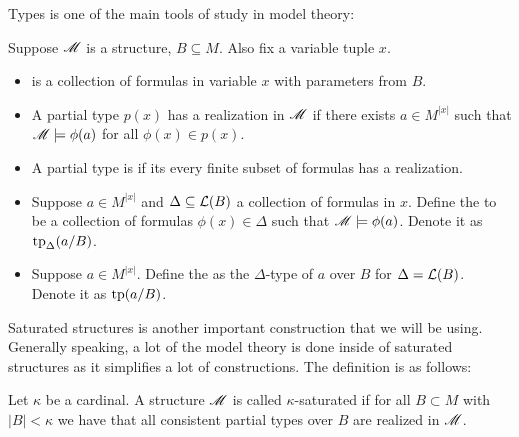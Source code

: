 Types is one of the main tools of study in model theory:
\begin{Definition}
  Suppose $\mathscr M$ is a structure, $B \subseteq M$.
  Also fix a variable tuple $x$.
  \begin{itemize}
  \item {} is a collection of formulas in variable $x$ with parameters from $B$.
  \item A partial type $p(x)$ has a realization in $\mathscr M$ if there exists $a \in M^{|x|}$ such that
    $\mathscr M \models \phi(a)$ for all $\phi(x) \in p(x)$.
  \item A partial type is  if its every finite subset of formulas has a realization.
  \item Suppose $a \in M^{|x|}$ and $\Delta \subseteq \mathcal L(B)$ a collection of formulas in $x$.
    Define the  to be a collection of formulas $\phi(x) \in \Delta$
    such that $\mathscr M \models \phi(a)$.
    Denote it as $\operatorname{tp}_{\Delta}(a/B)$.
  \item Suppose $a \in M^{|x|}$.
    Define the  as the $\Delta$-type of $a$ over $B$ for $\Delta = \mathcal L(B)$.
    Denote it as $\operatorname{tp}(a/B)$.
  \end{itemize}
\end{Definition}

Saturated structures is another important construction that we will be using.
Generally speaking, a lot of the model theory is done inside of saturated structures as it simplifies a lot of constructions.
The definition is as follows:
\begin{Definition}
  Let $\kappa$ be a cardinal.
  A structure $\mathscr M$ is called $\kappa$-saturated if for all $B \subset M$ with $|B| < \kappa$
  we have that all consistent partial types over $B$ are realized in $\mathscr M$.
\end{Definition}

